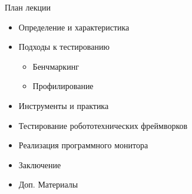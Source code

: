 \begin{frame}
	\titlepage
\end{frame}

\begin{frame}{План лекции}
	\begin{itemize}
		\item Определение и характеристика
		\item Подходы к тестированию
		\begin{itemize}
			\item Бенчмаркинг
			\item Профилирование
		\end{itemize}
		\item Инструменты и практика
		\item Тестирование робототехнических фреймворков
		\item Реализация программного монитора
		\item Заключение
		\item Доп. Материалы
	\end{itemize}
\end{frame}
